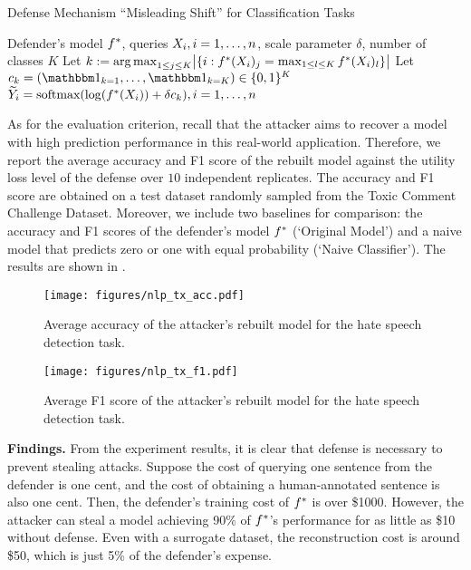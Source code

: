         
        \begin{algorithm}[tb]
        \caption{Defense Mechanism ``Misleading Shift'' for Classification Tasks}\label{alg:ms}
        \begin{algorithmic}[1]
            \Require Defender's model $f^*$, queries $X_i, i=1, \ldots ,n$, scale parameter $\delta$, number of classes $K$
            \State Let $k := \operatorname*{\arg\max}_{1\leq j \leq K} \bigl\vert\{i: f^*(X_i)_j = \max_{1\leq l\leq K} f^*(X_i)_l \}\bigr\vert$ 
            \State  Let $c_k = (\ind_{k=1}, \dots, \ind_{k=K}) \in \{0,1\}^K$ 
            \Ensure $\widetilde{Y}_i = \textrm{softmax}(\log(f^*(X_i))+\delta c_k), i=1, \ldots ,n$
        \end{algorithmic}
        \end{algorithm}  

 
    As for the evaluation criterion, recall that the attacker aims to recover a model with high prediction performance in this real-world application. Therefore, we report the average accuracy and F1 score of the rebuilt model against the utility loss level of the defense over $10$ independent replicates. The accuracy and F1 score are obtained on a test dataset randomly sampled from the Toxic Comment Challenge Dataset. Moreover, we include two baselines for comparison: the accuracy and F1 scores of the defender's model $f^*$ (`Original Model') and a naive model that predicts zero or one with equal probability (`Naive Classifier'). The results are shown in .  

    \begin{figure}[tb]
    \centering
    \texttt{[image: figures/nlp\_tx\_acc.pdf]}
    \caption{Average accuracy of the attacker's rebuilt model for the hate speech detection task. }
    \label{fig:nlp_acc}
\end{figure}

\begin{figure}[tb]
    \centering
    \texttt{[image: figures/nlp\_tx\_f1.pdf]}
    \caption{Average F1 score of the attacker's rebuilt model for the hate speech detection task.}
    \label{fig:nlp_f1}
\end{figure}


    \textbf{Findings.} From the experiment results, it is clear that defense is necessary to prevent stealing attacks. Suppose the cost of querying one sentence from the defender is one cent, and the cost of obtaining a human-annotated sentence is also one cent. Then, the defender's training cost of $f^*$ is over \$1000. However, the attacker can steal a model achieving 90\% of $f^*$'s performance for as little as \$10 without defense. Even with a surrogate dataset, the reconstruction cost is around \$50, which is just 5\% of the defender's expense.

